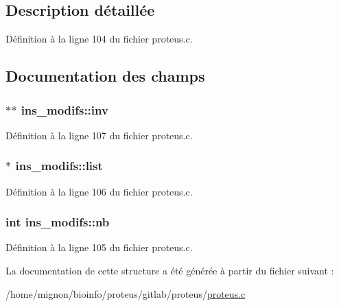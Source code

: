 \subsection{Description détaillée}


Définition à la ligne 104 du fichier proteus.\+c.



\subsection{Documentation des champs}
\hypertarget{structins__modifs_aac36a2150609ffb8ad29a13284470d79}{
\subsubsection[{inv}]{$\ast$$\ast$ ins\+\_\+modifs\+::inv}}\label{structins__modifs_aac36a2150609ffb8ad29a13284470d79}


Définition à la ligne 107 du fichier proteus.\+c.

\hypertarget{structins__modifs_ad0423084c60b32fa9d0cceea943dfb29}{
\subsubsection[{list}]{$\ast$ ins\+\_\+modifs\+::list}}\label{structins__modifs_ad0423084c60b32fa9d0cceea943dfb29}


Définition à la ligne 106 du fichier proteus.\+c.

\hypertarget{structins__modifs_aa4cf2947c9ecaf7d35d4eb9d2da4c7e7}{
\subsubsection[{nb}]{\setlength{\rightskip}{0pt plus 5cm}int ins\+\_\+modifs\+::nb}}\label{structins__modifs_aa4cf2947c9ecaf7d35d4eb9d2da4c7e7}


Définition à la ligne 105 du fichier proteus.\+c.



La documentation de cette structure a été générée à partir du fichier suivant \+:\begin{DoxyCompactItemize}
\item 
/home/mignon/bioinfo/proteus/gitlab/proteus/\hyperlink{proteus_8c}{proteus.\+c}\end{DoxyCompactItemize}
